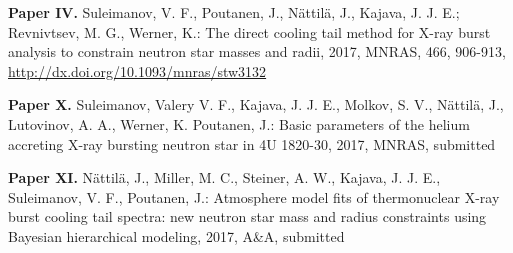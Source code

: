 \vspace{0.3cm}
\textbf{Paper IV.} Suleimanov, V. F., Poutanen, J., Nättilä, J., Kajava, J. J. E.; Revnivtsev, M. G., Werner, K.: The direct cooling tail method for X-ray burst analysis to constrain neutron star masses and radii, 2017, MNRAS, 466, 906-913, \url{http://dx.doi.org/10.1093/mnras/stw3132}
 

\vspace{0.3cm}
\textbf{Paper X.} Suleimanov, Valery V. F., Kajava, J. J. E., Molkov, S. V., Nättilä, J., Lutovinov, A. A., Werner, K. Poutanen, J.: Basic parameters of the helium accreting X-ray bursting neutron star in 4U 1820-30, 2017, MNRAS, submitted


\vspace{0.3cm}
\textbf{Paper XI.} Nättilä, J., Miller, M. C., Steiner, A. W., Kajava, J. J. E., Suleimanov, V. F., Poutanen, J.: Atmosphere model fits of thermonuclear X-ray burst cooling tail spectra: new neutron star mass and radius constraints using Bayesian hierarchical modeling, 2017, A\&A, submitted







